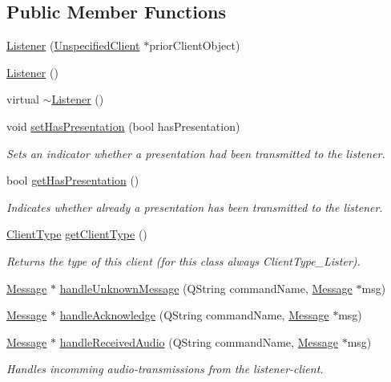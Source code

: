 \subsection*{Public Member Functions}
\begin{DoxyCompactItemize}
\item 
\hyperlink{class_server_appl_1_1_listener_a0f28cc922a98983d0f6caaa6cbeb2170}{Listener} (\hyperlink{class_server_appl_1_1_unspecified_client}{Unspecified\+Client} $\ast$prior\+Client\+Object)
\item 
\hyperlink{class_server_appl_1_1_listener_abf3410b4c48da3098d278a9c2620e1e1}{Listener} ()
\item 
virtual \hyperlink{class_server_appl_1_1_listener_a87140a72f6f36f32654d80f55654a04c}{$\sim$\+Listener} ()
\item 
void \hyperlink{class_server_appl_1_1_listener_add510cf0b4761fbbb26e317161741133}{set\+Has\+Presentation} (bool has\+Presentation)
\begin{DoxyCompactList}\small\item\em Sets an indicator whether a presentation had been transmitted to the listener. \end{DoxyCompactList}\item 
bool \hyperlink{class_server_appl_1_1_listener_a9d5bd732a72f742a9ff76020b18a44f7}{get\+Has\+Presentation} ()
\begin{DoxyCompactList}\small\item\em Indicates whether already a presentation has been transmitted to the listener. \end{DoxyCompactList}\item 
\hyperlink{_unspecified_client_8h_af7f22c7d662171af2c3a5b74f621dc98}{Client\+Type} \hyperlink{class_server_appl_1_1_listener_a016b2bc155a45663fb3f9d92ece9fef7}{get\+Client\+Type} ()
\begin{DoxyCompactList}\small\item\em Returns the type of this client (for this class always Client\+Type\+\_\+\+Lister). \end{DoxyCompactList}\item 
\hyperlink{class_message}{Message} $\ast$ \hyperlink{class_server_appl_1_1_listener_a1cebfded97f01e360f20c9c836b6351c}{handle\+Unknown\+Message} (Q\+String command\+Name, \hyperlink{class_message}{Message} $\ast$msg)
\item 
\hyperlink{class_message}{Message} $\ast$ \hyperlink{class_server_appl_1_1_listener_a706a47dd41d7580559db8c36b48778d5}{handle\+Acknowledge} (Q\+String command\+Name, \hyperlink{class_message}{Message} $\ast$msg)
\item 
\hyperlink{class_message}{Message} $\ast$ \hyperlink{class_server_appl_1_1_listener_a222dd5f0471b0ccf4de504dbf676bad8}{handle\+Received\+Audio} (Q\+String command\+Name, \hyperlink{class_message}{Message} $\ast$msg)
\begin{DoxyCompactList}\small\item\em Handles incomming audio-\/transmissions from the listener-\/client. \end{DoxyCompactList}\end{DoxyCompactItemize}
